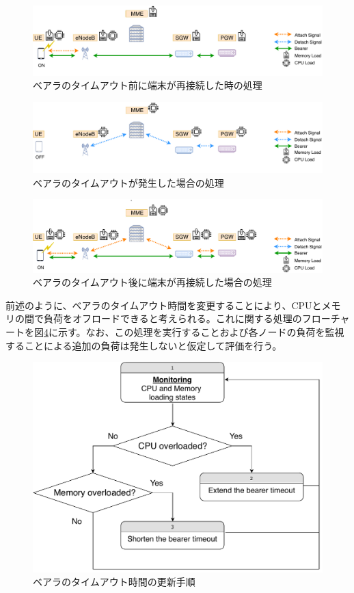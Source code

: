 \documentclass[a4j]{ujarticle}
\begin{document}
\begin{figure}[htbp]
	\centering
	\includegraphics[width=0.7\hsize]{detach-reON.pdf}
  \caption{ベアラのタイムアウト前に端末が再接続した時の処理}
	\label{detach-reON}
\end{figure}

\begin{figure}[htbp]
	\centering
	\includegraphics[width=0.7\hsize]{detach-timeout.pdf}
  \caption{ベアラのタイムアウトが発生した場合の処理}
	\label{detach-timeout}
\end{figure}

\begin{figure}[htbp]
	\centering
	\includegraphics[width=0.7\hsize]{detach-timeout-ON.pdf}
  \caption{ベアラのタイムアウト後に端末が再接続した場合の処理}
	\label{detach-timeout-ON}
\end{figure}

前述のように、ベアラのタイムアウト時間を変更することにより、CPUとメモリの間で負荷をオフロードできると考えられる。これに関する処理のフローチャートを図\ref{chart}に示す。なお、この処理を実行することおよび各ノードの負荷を監視することによる追加の負荷は発生しないと仮定して評価を行う。
\begin{figure}[htbp]
	\centering
	\includegraphics[width=0.7\hsize]{chart.pdf}
  \caption{ベアラのタイムアウト時間の更新手順}
	\label{chart}
\end{figure}
\end{document}
